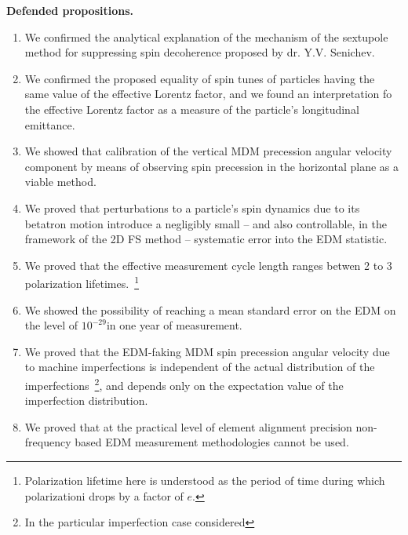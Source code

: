 \textbf{Defended propositions.}
\begin{enumerate}[(1)]
	\item We confirmed the analytical explanation of the mechanism of the sextupole method for
        suppressing spin decoherence proposed by dr. Y.V. Senichev. %
  	\item We confirmed the proposed equality of spin tunes of particles having the same value of the
        effective Lorentz factor, and we found an interpretation fo the effective Lorentz factor as
        a measure of the particle's longitudinal emittance. %
  	\item We showed that calibration of the vertical MDM precession angular velocity component
        by means of observing spin precession in the horizontal plane as a viable method.
  	\item We proved that perturbations to a particle's spin dynamics due to its betatron motion
        introduce a negligibly small -- and also controllable, in the framework of the
        2D FS method -- systematic error into the EDM statistic. %
  	\item We proved that the effective measurement cycle length ranges betwen 2 to 3
        polarization lifetimes.~\footnote{Polarization lifetime here is understood as
        the period of time during which polarizationi drops by a factor of $e$.}
  	\item We showed the possibility of reaching a mean standard error on the EDM on
        the level of $10^{-29}$\ecm in one year of measurement. %
  	\item We proved that the EDM-faking MDM spin precession angular velocity due to machine
        imperfections is independent of the actual distribution of the imperfections~\footnote{
        In the particular imperfection case considered}, and depends only on the expectation value of the
        imperfection distribution. %
  	\item We proved that at the practical level of element alignment precision non-frequency
        based EDM measurement methodologies cannot be used.
\end{enumerate}
